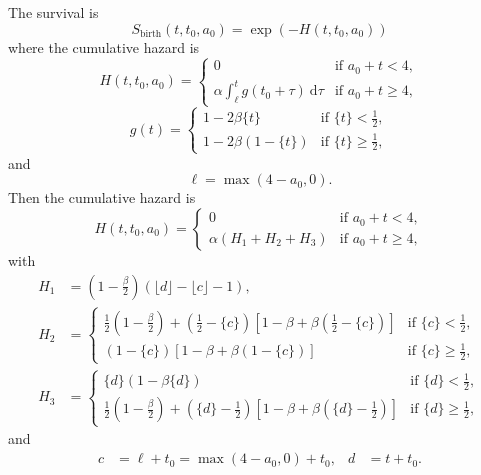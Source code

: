 \documentclass{article}
\newcommand{\md}{\mathrm{d}}
\begin{document}
The survival is
\begin{equation}
  S_{\text{birth}}(t, t_0, a_0) = \exp\left(- H(t, t_0, a_0)\right)
\end{equation}
where the cumulative hazard is
\begin{equation}
  H(t, t_0, a_0) = 
  \begin{cases}
    0 & \text{if $a_0 + t < 4$},
    \\
    \alpha \int_{\ell}^t g(t_0 + \tau)~\md \tau
    & \text{if $a_0 + t \geq 4$},
  \end{cases}
\end{equation}
\begin{equation}
  g (t) =
  \begin{cases}
    1 - 2 \beta \{t\}
    & \text{if $\{t\} < \frac{1}{2}$},
    \\
    1 - 2 \beta (1 - \{t\})
    & \text{if $\{t\} \geq \frac{1}{2}$},
  \end{cases}
\end{equation}
and
\begin{equation}
  \ell = \max(4 - a_0, 0).
\end{equation}
Then the cumulative hazard is
\begin{equation}
  H(t, t_0, a_0) =
  \begin{cases}
    0 & \text{if $a_0 + t < 4$},
    \\
    \alpha \left(H_1  + H_2 + H_3\right)
    & \text{if $a_0 + t \geq 4$},
  \end{cases}
\end{equation}
with
\begin{align}
  H_1 &= \left(1 - \frac{\beta}{2}\right)
  \left(\lfloor d \rfloor - \lfloor c \rfloor - 1\right),
  \\
  H_2 &=
  \begin{cases}
    \frac{1}{2} \left(1 - \frac{\beta}{2}\right)
    + \left(\frac{1}{2} - \{c\}\right)
    \left[1 - \beta
      + \beta \left(\frac{1}{2} - \{c\}\right)\right]
    & \text{if $\{c\} < \frac{1}{2}$},
    \\
    \left(1 - \{c\}\right)
    \left[1 - \beta + \beta \left(1 - \{c\}\right)\right]
    & \text{if $\{c\} \geq \frac{1}{2}$},
  \end{cases}
  \\
  H_3 &=
  \begin{cases}
    \{d\}\left(1 - \beta \{d\}\right)
    & \text{if $\{d\} < \frac{1}{2}$},
    \\
    \frac{1}{2} \left(1 - \frac{\beta}{2}\right)
    + \left(\{d\} - \frac{1}{2}\right)
    \left[1 - \beta
      + \beta \left(\{d\} - \frac{1}{2}\right)\right]
    & \text{if $\{d\} \geq \frac{1}{2}$},
    \end{cases}
\end{align}
and
\begin{align}
  c &= \ell + t_0 = \max(4 - a_0, 0) + t_0,
  &
  d &= t + t_0.
\end{align}
\end{document}

